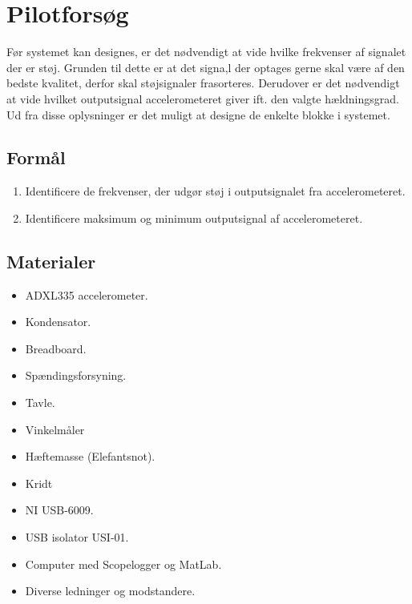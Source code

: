 \section{Pilotforsøg}
Før systemet kan designes, er det nødvendigt at vide hvilke frekvenser af signalet der er støj. Grunden til dette er at det signa,l der optages gerne skal være af den bedste kvalitet, derfor skal støjsignaler frasorteres. Derudover er det nødvendigt at vide hvilket outputsignal accelerometeret giver ift. den valgte hældningsgrad. Ud fra disse oplysninger er det muligt at designe de enkelte blokke i systemet.%

\subsection{Formål}
\begin{enumerate}
\item Identificere de frekvenser, der udgør støj i outputsignalet fra accelerometeret.
\item Identificere maksimum og minimum outputsignal af accelerometeret.
\end{enumerate}

\subsection{Materialer}
\begin{itemize}
\item ADXL335 accelerometer.
\item Kondensator.
\item Breadboard.
\item Spændingsforsyning.
\item Tavle.
\item Vinkelmåler
\item Hæftemasse (Elefantsnot).
\item Kridt
\item NI USB-6009.
\item USB isolator USI-01.
\item Computer med Scopelogger og MatLab.
\item Diverse ledninger og modstandere.
\end{itemize}

